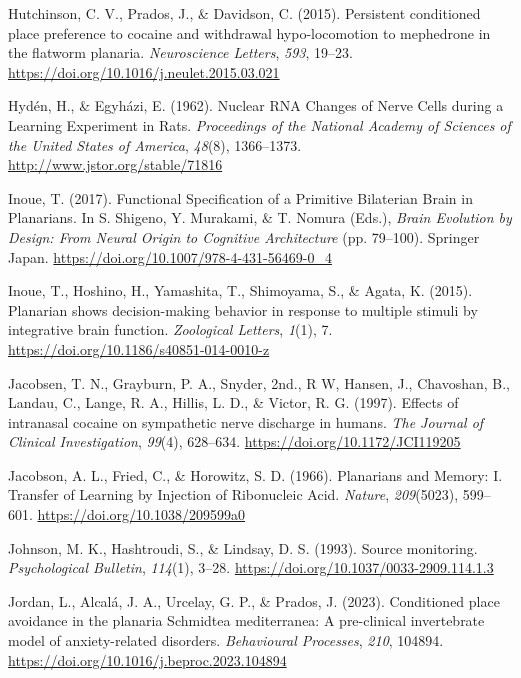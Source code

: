 \documentclass[
  jou,
  floatsintext,
  longtable,
  nolmodern,
  notxfonts,
  notimes,
  donotrepeattitle,
  colorlinks=true,linkcolor=blue,citecolor=blue,urlcolor=blue]{apa7}
\newlength{\cslhangindent}
\newenvironment{CSLReferences}[2] %
 {\begin{list}{}{%
  \setlength{\itemindent}{0pt}
  \setlength{\leftmargin}{0pt}
  \setlength{\parsep}{0pt}
  \ifodd #1
   \setlength{\leftmargin}{\cslhangindent}
   \setlength{\itemindent}{-1\cslhangindent}
  \fi
  \setlength{\itemsep}{#2\baselineskip}}}
 {\end{list}}
\begin{document}
\begin{CSLReferences}{1}{0}
Hutchinson, C. V., Prados, J., \& Davidson, C. (2015). Persistent
conditioned place preference to cocaine and withdrawal hypo-locomotion
to mephedrone in the flatworm planaria. \emph{Neuroscience Letters},
\emph{593}, 19--23. \url{https://doi.org/10.1016/j.neulet.2015.03.021}

Hydén, H., \& Egyházi, E. (1962). Nuclear {RNA} {Changes} of {Nerve}
{Cells} during a {Learning} {Experiment} in {Rats}. \emph{Proceedings of
the National Academy of Sciences of the United States of America},
\emph{48}(8), 1366--1373. \url{http://www.jstor.org/stable/71816}

Inoue, T. (2017). Functional {Specification} of a {Primitive}
{Bilaterian} {Brain} in {Planarians}. In S. Shigeno, Y. Murakami, \& T.
Nomura (Eds.), \emph{Brain {Evolution} by {Design}: {From} {Neural}
{Origin} to {Cognitive} {Architecture}} (pp. 79--100). Springer Japan.
\url{https://doi.org/10.1007/978-4-431-56469-0_4}

Inoue, T., Hoshino, H., Yamashita, T., Shimoyama, S., \& Agata, K.
(2015). Planarian shows decision-making behavior in response to multiple
stimuli by integrative brain function. \emph{Zoological Letters},
\emph{1}(1), 7. \url{https://doi.org/10.1186/s40851-014-0010-z}

Jacobsen, T. N., Grayburn, P. A., Snyder, 2nd., R W, Hansen, J.,
Chavoshan, B., Landau, C., Lange, R. A., Hillis, L. D., \& Victor, R. G.
(1997). Effects of intranasal cocaine on sympathetic nerve discharge in
humans. \emph{The Journal of Clinical Investigation}, \emph{99}(4),
628--634. \url{https://doi.org/10.1172/JCI119205}

Jacobson, A. L., Fried, C., \& Horowitz, S. D. (1966). Planarians and
{Memory}: {I}. {Transfer} of {Learning} by {Injection} of {Ribonucleic}
{Acid}. \emph{Nature}, \emph{209}(5023), 599--601.
\url{https://doi.org/10.1038/209599a0}

Johnson, M. K., Hashtroudi, S., \& Lindsay, D. S. (1993). Source
monitoring. \emph{Psychological Bulletin}, \emph{114}(1), 3--28.
\url{https://doi.org/10.1037/0033-2909.114.1.3}

Jordan, L., Alcalá, J. A., Urcelay, G. P., \& Prados, J. (2023).
Conditioned place avoidance in the planaria {Schmidtea} mediterranea:
{A} pre-clinical invertebrate model of anxiety-related disorders.
\emph{Behavioural Processes}, \emph{210}, 104894.
\url{https://doi.org/10.1016/j.beproc.2023.104894}


\end{CSLReferences}
\end{document}
